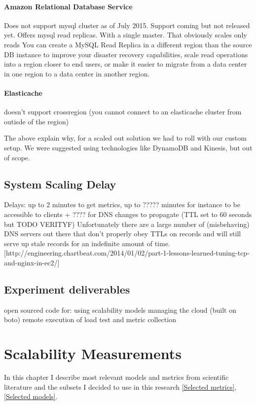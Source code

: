\documentclass{uvamscse}
\begin{document}
\subsubsection{Amazon Relational Database Service}
Does not support mysql cluster as of July 2015. Support coming but not released yet.
Offers mysql read replicas. With a single master. That obviously scales only reads
You can create a MySQL Read Replica in a different region than the source DB instance to improve your disaster recovery capabilities, scale read operations into a region closer to end users, or make it easier to migrate from a data center in one region to a data center in another region.

\subsubsection{Elasticache}
doesn't support crossregion (you cannot connect to an elasticache cluster from outisde of the region)

The above explain why, for a scaled out solution we had to roll with our custom setup. We were suggested using technologies like DynamoDB and Kinesis, but out of scope.

\section{System Scaling Delay}
Delays: up to 2 minutes to get metrics, up to ????? minutes for instance to be accessible to clients + ???? for DNS changes to propagate (TTL set to 60 seconds but TODO VERITYF)
Unfortunately there are a large number of (misbehaving) DNS servers out there that don’t properly obey TTLs on records and will still serve up stale records for an indefinite amount of time. [http://engineering.chartbeat.com/2014/01/02/part-1-lessons-learned-tuning-tcp-and-nginx-in-ec2/]

\section{Experiment deliverables}\label{Experiment deliverables}
open sourced code for:
using scalability models
managing the cloud (built on boto)
remote execution of load test and metric collection



\chapter{Scalability Measurements} \label{Scalability Measurements}
In this chapter I describe most relevant models and metrics from scientific literature and the subsets I decided to use in this research \ref{Selected metrics}, \ref{Selected models}.
\end{document}
